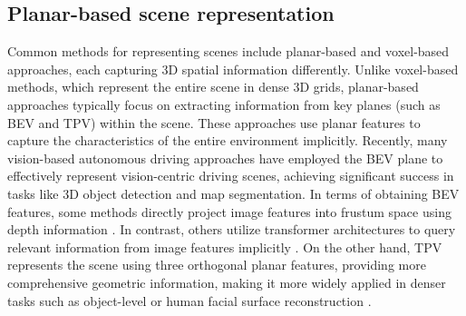 \documentclass[letterpaper, 10 pt, conference]{ieeeconf}  %
\begin{document}
\subsection{Planar-based scene representation}
Common methods for representing scenes include planar-based and voxel-based approaches, each capturing 3D spatial information differently. Unlike voxel-based methods, which represent the entire scene in dense 3D grids, planar-based approaches typically focus on extracting information from key planes (such as BEV and TPV) within the scene. These approaches use planar features to capture the characteristics of the entire environment implicitly. Recently, many vision-based autonomous driving approaches have employed the BEV plane to effectively represent vision-centric driving scenes, achieving significant success in tasks like 3D object detection and map segmentation. In terms of obtaining BEV features, some methods directly project image features into frustum space using depth information \cite{philion2020lift, huang2021bevdet, li2023bevdepth, park2022time, chi2023bev}. In contrast, others utilize transformer architectures to query relevant information from image features implicitly \cite{li2022bevformer, liu2022petr, wang2023exploring}. On the other hand, TPV represents the scene using three orthogonal planar features, providing more comprehensive geometric information, making it more widely applied in denser tasks such as object-level or human facial surface reconstruction \cite{wang2023pet, wang2023alto, ma2023otavatar, zou2024triplane}. 

\end{document}
